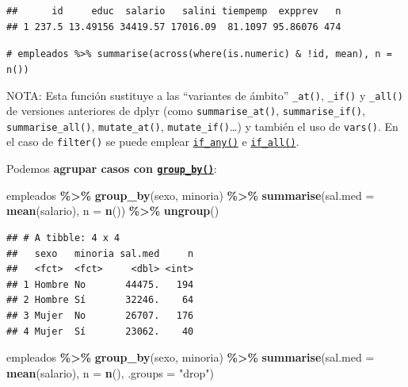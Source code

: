 \documentclass[
]{book}
\newenvironment{Shaded}{\begin{snugshade}}{\end{snugshade}}
\newcommand{\AttributeTok}[1]{\textcolor[rgb]{0.13,0.29,0.53}{#1}}
\newcommand{\CommentTok}[1]{\textcolor[rgb]{0.56,0.35,0.01}{\textit{#1}}}
\newcommand{\FunctionTok}[1]{\textcolor[rgb]{0.13,0.29,0.53}{\textbf{#1}}}
\newcommand{\NormalTok}[1]{#1}
\newcommand{\SpecialCharTok}[1]{\textcolor[rgb]{0.81,0.36,0.00}{\textbf{#1}}}
\newcommand{\StringTok}[1]{\textcolor[rgb]{0.31,0.60,0.02}{#1}}
\theoremstyle{break}
\theoremstyle{nonumberplain}
\renewcommand{\CommentTok}[1]{\textcolor[rgb]{0.41,0.41,0.41}{\texttt{#1}}}
\begin{document}
\begin{verbatim}
##      id     educ  salario   salini tiempemp  expprev   n
## 1 237.5 13.49156 34419.57 17016.09  81.1097 95.86076 474
\end{verbatim}

\begin{Shaded}
\begin{Highlighting}[]
\CommentTok{\# empleados \%\textgreater{}\% summarise(across(where(is.numeric) \& !id, mean), n = n())}
\end{Highlighting}
\end{Shaded}

NOTA: Esta función sustituye a las ``variantes de ámbito'' \texttt{\_at()}, \texttt{\_if()} y \texttt{\_all()} de versiones anteriores de dplyr (como \texttt{summarise\_at()}, \texttt{summarise\_if()}, \texttt{summarise\_all()}, \texttt{mutate\_at()}, \texttt{mutate\_if()}\ldots) y también el uso de \texttt{vars()}.
En el caso de \texttt{filter()} se puede emplear \href{https://dplyr.tidyverse.org/reference/across.html}{\texttt{if\_any()}} e \href{https://dplyr.tidyverse.org/reference/across.html}{\texttt{if\_all()}}.

Podemos \textbf{agrupar casos con \href{https://dplyr.tidyverse.org/reference/group_by.html}{\texttt{group\_by()}}}:

\begin{Shaded}
\begin{Highlighting}[]
\NormalTok{empleados }\SpecialCharTok{\%\textgreater{}\%} \FunctionTok{group\_by}\NormalTok{(sexo, minoria) }\SpecialCharTok{\%\textgreater{}\%} 
    \FunctionTok{summarise}\NormalTok{(}\AttributeTok{sal.med =} \FunctionTok{mean}\NormalTok{(salario), }\AttributeTok{n =} \FunctionTok{n}\NormalTok{()) }\SpecialCharTok{\%\textgreater{}\%}
    \FunctionTok{ungroup}\NormalTok{()}
\end{Highlighting}
\end{Shaded}

\begin{verbatim}
## # A tibble: 4 x 4
##   sexo   minoria sal.med     n
##   <fct>  <fct>     <dbl> <int>
## 1 Hombre No       44475.   194
## 2 Hombre Sí       32246.    64
## 3 Mujer  No       26707.   176
## 4 Mujer  Sí       23062.    40
\end{verbatim}

\begin{Shaded}
\begin{Highlighting}[]
\NormalTok{empleados }\SpecialCharTok{\%\textgreater{}\%} \FunctionTok{group\_by}\NormalTok{(sexo, minoria) }\SpecialCharTok{\%\textgreater{}\%} 
    \FunctionTok{summarise}\NormalTok{(}\AttributeTok{sal.med =} \FunctionTok{mean}\NormalTok{(salario), }\AttributeTok{n =} \FunctionTok{n}\NormalTok{(), }\AttributeTok{.groups =} \StringTok{"drop"}\NormalTok{)}
\end{Highlighting}
\end{Shaded}
\end{document}
